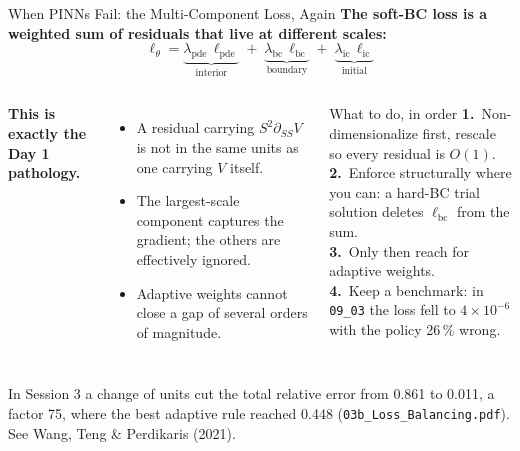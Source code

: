\documentclass[aspectratio=169,11pt]{beamer}
\newcommand{\emphc}[1]{\textcolor{harvardcrimson}{#1}}
\begin{document}
\begin{frame}{When PINNs Fail: the Multi-Component Loss, Again}
\vspace{-0.2em}
\textbf{The soft-BC loss is a weighted sum of residuals that live at different scales:}
\[
\ell_\theta = \underbrace{\lambda_{\text{pde}}\,\ell_{\text{pde}}}_{\text{interior}}
\;+\; \underbrace{\lambda_{\text{bc}}\,\ell_{\text{bc}}}_{\text{boundary}}
\;+\; \underbrace{\lambda_{\text{ic}}\,\ell_{\text{ic}}}_{\text{initial}}
\]

\vspace{0.1em}
\begin{columns}[T]
\textbf{This is exactly the Day 1 pathology.}
\begin{itemize}\setlength\itemsep{2pt}
    \item A residual carrying $S^2\partial_{SS}V$ is not in the same units as one carrying $V$ itself.
    \item The largest-scale component captures the gradient; the others are effectively ignored.
    \item Adaptive weights cannot close a gap of several orders of magnitude.
\end{itemize}

\begin{block}{What to do, in order}
\small
\textbf{1.}~\emphc{Non-dimensionalize} first, rescale so every residual is $O(1)$.\\[3pt]
\textbf{2.}~Enforce \emphc{structurally} where you can: a hard-BC trial solution deletes $\ell_{\text{bc}}$ from the sum.\\[3pt]
\textbf{3.}~Only then reach for adaptive weights.\\[2pt]
\textbf{4.}~\emphc{Keep a benchmark}: in \texttt{09\_03} the loss fell to $4\times10^{-6}$ with the policy 26\,\% wrong.
\end{block}
\end{columns}

\vspace{0.3em}
{\footnotesize In Session 3 a change of units cut the total relative error from 0.861 to 0.011, a factor 75, where the best adaptive rule reached 0.448 (\texttt{03b\_Loss\_Balancing.pdf}). See Wang, Teng \& Perdikaris (2021).}
\end{frame}
\end{document}
